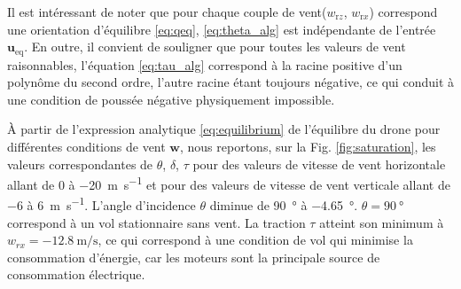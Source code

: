     Il est intéressant de noter que pour chaque couple de vent($w_{\text{r}z}$, $w_{\text{r}x}$) correspond une orientation d'équilibre \eqref{eq:qeq}, \eqref{eq:theta_alg} est indépendante de l'entrée $\boldsymbol{u}_{\text{eq}}$. En outre, il convient de souligner que pour toutes les valeurs de vent raisonnables, l'équation \eqref{eq:tau_alg} correspond à la racine positive d'un polynôme du second ordre, l'autre racine étant toujours négative, ce qui conduit à une condition de poussée négative physiquement impossible.


    À partir de l'expression analytique \eqref{eq:equilibrium} de l'équilibre du drone pour différentes conditions de vent $\boldsymbol{w}$, nous reportons, sur la Fig. \ref{fig:saturation}, les valeurs correspondantes de $\theta$, $\delta$, $\tau$ pour des valeurs de vitesse de vent horizontale allant de 0 à \SI{-20}{\meter\per\second} et pour des valeurs de vitesse de vent verticale allant de \SI{-6}{} à \SI{6}{\meter\per\second}. L'angle d'incidence $\theta$ diminue de \SI{90}{\degree} à \SI{-4.65}{\degree}. $\theta = \SI{90}{\degree}$ correspond à un vol stationnaire sans vent. La traction $\tau$ atteint son minimum à $w_{rx} = \SI{-12.8}{\meter\per\second}$, ce qui correspond à une condition de vol qui minimise la consommation d'énergie, car les moteurs sont la principale source de consommation électrique.

